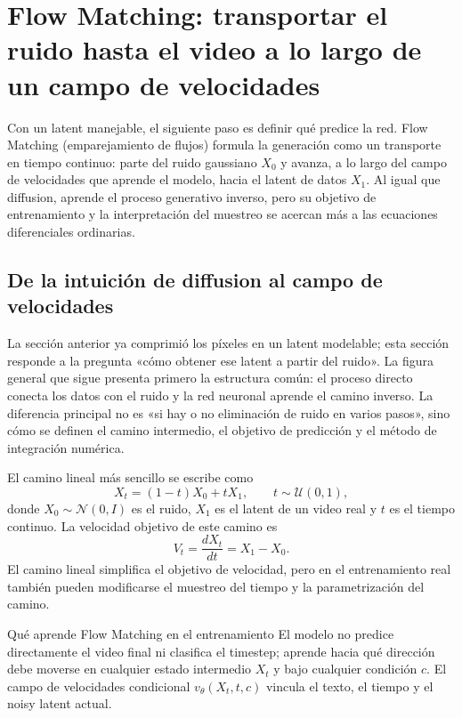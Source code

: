 \section{Flow Matching: transportar el ruido hasta el video a lo largo de un campo de velocidades}

Con un latent manejable, el siguiente paso es definir qué predice la red. Flow Matching (emparejamiento de flujos) formula la generación como un transporte en tiempo continuo: parte del ruido gaussiano $X_0$ y avanza, a lo largo del campo de velocidades que aprende el modelo, hacia el latent de datos $X_1$. Al igual que diffusion, aprende el proceso generativo inverso, pero su objetivo de entrenamiento y la interpretación del muestreo se acercan más a las ecuaciones diferenciales ordinarias.

\subsection{De la intuición de diffusion al campo de velocidades}

La sección anterior ya comprimió los píxeles en un latent modelable; esta sección responde a la pregunta «cómo obtener ese latent a partir del ruido». La figura general que sigue presenta primero la estructura común: el proceso directo conecta los datos con el ruido y la red neuronal aprende el camino inverso. La diferencia principal no es «si hay o no eliminación de ruido en varios pasos», sino cómo se definen el camino intermedio, el objetivo de predicción y el método de integración numérica.


El camino lineal más sencillo se escribe como
\[
X_t=(1-t)X_0+tX_1,
\qquad t\sim\mathcal U(0,1),
\]
donde $X_0\sim\mathcal N(0,I)$ es el ruido, $X_1$ es el latent de un video real y $t$ es el tiempo continuo. La velocidad objetivo de este camino es
\[
V_t=\frac{dX_t}{dt}=X_1-X_0.
\]
El camino lineal simplifica el objetivo de velocidad, pero en el entrenamiento real también pueden modificarse el muestreo del tiempo y la parametrización del camino.

\begin{importantbox}{Qué aprende Flow Matching en el entrenamiento}
El modelo no predice directamente el video final ni clasifica el timestep; aprende hacia qué dirección debe moverse en cualquier estado intermedio $X_t$ y bajo cualquier condición $c$. El campo de velocidades condicional $v_\theta(X_t,t,c)$ vincula el texto, el tiempo y el noisy latent actual.
\end{importantbox}

